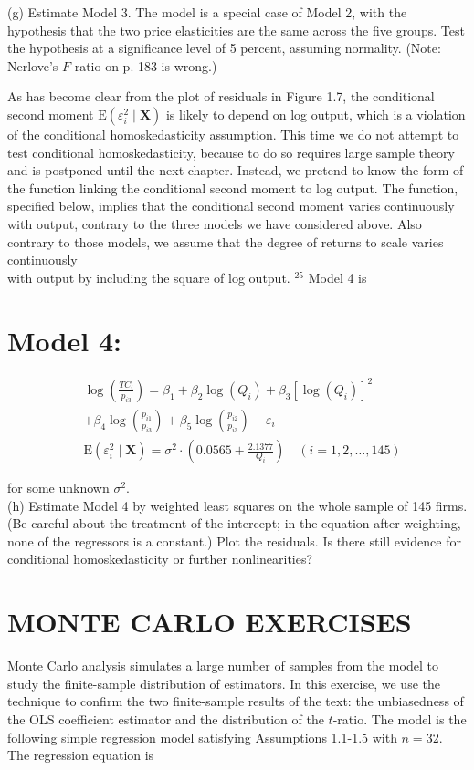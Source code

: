 \documentclass[10pt]{article}
\begin{document}
(g) Estimate Model 3. The model is a special case of Model 2, with the hypothesis that the two price elasticities are the same across the five groups. Test the hypothesis at a significance level of 5 percent, assuming normality. (Note: Nerlove's $F$-ratio on p. 183 is wrong.)

As has become clear from the plot of residuals in Figure 1.7, the conditional second moment $\mathrm{E}\left(\varepsilon_{i}^{2} \mid \mathbf{X}\right)$ is likely to depend on log output, which is a violation of the conditional homoskedasticity assumption. This time we do not attempt to test conditional homoskedasticity, because to do so requires large sample theory and is postponed until the next chapter. Instead, we pretend to know the form of the function linking the conditional second moment to log output. The function, specified below, implies that the conditional second moment varies continuously with output, contrary to the three models we have considered above. Also contrary to those models, we assume that the degree of returns to scale varies continuously\\
with output by including the square of log output. ${ }^{25}$ Model 4 is

\section*{Model 4:}
$$
\begin{aligned}
& \log \left(\frac{T C_{i}}{p_{i 3}}\right)= \beta_{1}+\beta_{2} \log \left(Q_{i}\right)+\beta_{3}\left[\log \left(Q_{i}\right)\right]^{2} \\
&+\beta_{4} \log \left(\frac{p_{i 1}}{p_{i 3}}\right)+\beta_{5} \log \left(\frac{p_{i 2}}{p_{i 3}}\right)+\varepsilon_{i} \\
& \mathrm{E}\left(\varepsilon_{i}^{2} \mid \mathbf{X}\right)=\sigma^{2} \cdot\left(0.0565+\frac{2.1377}{Q_{i}}\right) \quad(i=1,2, \ldots, 145)
\end{aligned}
$$

for some unknown $\sigma^{2}$.\\
(h) Estimate Model 4 by weighted least squares on the whole sample of 145 firms. (Be careful about the treatment of the intercept; in the equation after weighting, none of the regressors is a constant.) Plot the residuals. Is there still evidence for conditional homoskedasticity or further nonlinearities?

\section*{MONTE CARLO EXERCISES}
Monte Carlo analysis simulates a large number of samples from the model to study the finite-sample distribution of estimators. In this exercise, we use the technique to confirm the two finite-sample results of the text: the unbiasedness of the OLS coefficient estimator and the distribution of the $t$-ratio. The model is the following simple regression model satisfying Assumptions 1.1-1.5 with $n=32$. The regression equation is
\end{document}
